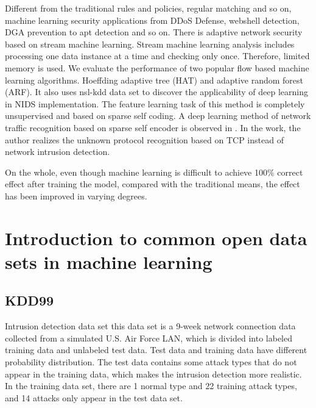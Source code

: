 \documentclass[UTF8]{article}
\begin{document}
\begin{itemize}
Different from the traditional rules and policies, regular matching and so on, machine learning security applications from DDoS Defense, webshell detection, DGA prevention to apt detection and so on. There is adaptive network security based on stream machine learning. Stream machine learning analysis includes processing one data instance at a time and checking only once. Therefore, limited memory is used. We evaluate the performance of two popular flow based machine learning algorithms. Hoeffding adaptive tree (HAT) and adaptive random forest (ARF). \cite{A Deep Learning Approach for Network Intrusion Detection System} It also uses nsl-kdd data set to discover the applicability of deep learning in NIDS implementation. \cite{5} The feature learning task of this method is completely unsupervised and based on sparse self coding. A deep learning method of network traffic recognition based on sparse self encoder is observed in \cite{Applications of Deep Learning on Traffic Identification}. In the work, the author realizes the unknown protocol recognition based on TCP instead of network intrusion detection.
	
\end{itemize}

	On the whole, even though machine learning is difficult to achieve 100\% correct effect after training the model, compared with the traditional means, the effect has been improved in varying degrees.
	



\section{Introduction to common open data sets in machine learning}

\subsection{KDD99 \cite{15}}

	Intrusion detection data set this data set is a 9-week network connection data collected from a simulated U.S. Air Force LAN, which is divided into labeled training data and unlabeled test data. Test data and training data have different probability distribution. The test data contains some attack types that do not appear in the training data, which makes the intrusion detection more realistic. In the training data set, there are 1 normal type and 22 training attack types, and 14 attacks only appear in the test data set.
\end{document}
